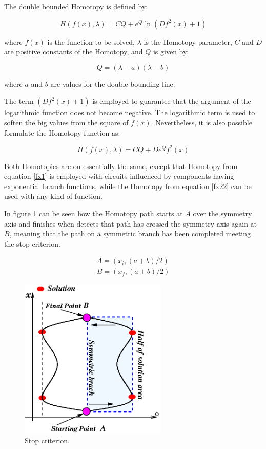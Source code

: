 \documentclass[conference,letterpaper,onecolumn]{IEEEtran}
\begin{document}
The double bounded Homotopy \cite{homo_iscas05} is defined by:

\begin{equation}
H(f(x),\lambda)=CQ+e^Q\ln(Df^2(x)+1)
\label{fx1}
\end{equation}

where $f(x)$ is the function to be solved, $\lambda$ is the Homotopy parameter, $C$ and $D$ are positive constants of the Homotopy, and $Q$ is given by:

\begin{displaymath}
Q=(\lambda-a)(\lambda-b)
\end{displaymath}

where $a$ and $b$ are values for the double bounding line.

The term $(Df^2(x)+1)$ is employed to guarantee that the argument of the logarithmic function does not become negative. The logarithmic term is used to soften the big values from the square of $f(x)$. Nevertheless, it is also possible formulate the Homotopy function as:

\begin{equation}
H(f(x),\lambda)=CQ+De^Q f^2(x)
\label{fx22}
\end{equation}

Both Homotopies are on essentially the same, except that Homotopy from equation \ref{fx1} is employed with circuits influenced by components having exponential branch functions, while the Homotopy from equation \ref{fx22} can be used with any kind of function.

In figure \ref{halftrack} can be seen how the Homotopy path starts at $A$ over the symmetry axis and finishes when detects that path has crossed the symmetry axis again at $B$, meaning that the path on a symmetric branch has been completed meeting the stop criterion.

\begin{displaymath}
\begin{array}{l}
A=(x_i,(a+b)/2)\\
B=(x_f,(a+b)/2)
\end{array}
\end{displaymath}

\begin{figure}[hbtp]
\centering
\includegraphics[width=7cm]{figs/chap3/figs/dbh2.eps}
\caption{Stop criterion.}
\label{halftrack}
\end{figure}
\end{document}
